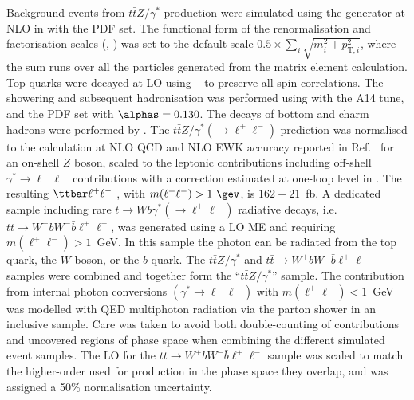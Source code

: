\documentclass[cernpreprint, atlasdraft=false, texlive=2023, UKenglish, texmf, orcidlogo]{atlasdoc}
\begin{document}
Background events from $t\bar{t}Z/\gamma^\ast$ production were simulated using
the \MGNLO[2.8.1] generator at NLO in \alphas with the \NNPDF[3.0nlo] PDF set. The functional form of the renormalisation and factorisation scales (\muR, \muF) was set to the default scale $0.5 \times \sum_i \sqrt{m^2_i+p^{2}_{\textrm{T},i}}$, where the sum runs over all the particles generated from the matrix element calculation.
Top quarks were decayed at LO using \MADSPIN~\cite{Frixione:2007zp,Artoisenet:2012st} to preserve all spin correlations.
The showering and subsequent hadronisation was performed
using \PYTHIA[8.244] with the A14 tune, and the \NNPDF[2.3lo] PDF set with $\alphas = 0.130$. The
decays of bottom and charm hadrons were performed
by \EVTGEN[1.7.0].
The $t\bar{t}Z/\gamma^\ast(\to \ell^+\ell^-)$ prediction was normalised to the calculation at NLO QCD and NLO EWK accuracy reported in
Ref.~\cite{YR4} for an on-shell $Z$ boson, scaled to the leptonic contributions including off-shell $\gamma^\ast\to\ell^+\ell^-$ contributions with a correction estimated at one-loop level in \alphas. The resulting $\ttbar\ell^+\ell^-$ \xs, with $m(\ell^+\ell^-) > 1~\gev$, is $162 \pm 21$~fb.
A dedicated \ttbar sample including rare $t \to Wb\gamma^\ast(\to \ell^+\ell^-)$ radiative decays, i.e.\ $t\bar{t} \to W^+bW^-\bar{b}\ell^+\ell^-$, was
generated using a LO ME and requiring $m(\ell^+\ell^-) > 1$~GeV. In this
sample the photon can be radiated from the top quark, the $W$ boson,
or the $b$-quark. The $t\bar{t}Z/\gamma^\ast$ and $t\bar{t} \to W^+bW^-\bar{b}\ell^+\ell^-$ samples were combined and together form the
\enquote{$t\bar{t}Z/\gamma^\ast$} sample. The contribution
from internal photon conversions $(\gamma^\ast \to \ell^+\ell^-)$ with
$m(\ell^+\ell^-) < 1$~GeV was modelled with QED multiphoton radiation via the
parton shower in an inclusive \ttbar sample.
Care was taken to avoid both double-counting of contributions and uncovered regions of phase
space when combining the different simulated event samples.  The LO \xs for the $t\bar{t} \to W^+bW^-\bar{b}\ell^+\ell^-$ sample was scaled to
match the higher-order \xs used for \ttbar production in the
phase space they overlap, and was assigned a 50\% normalisation
uncertainty.
 
\end{document}
